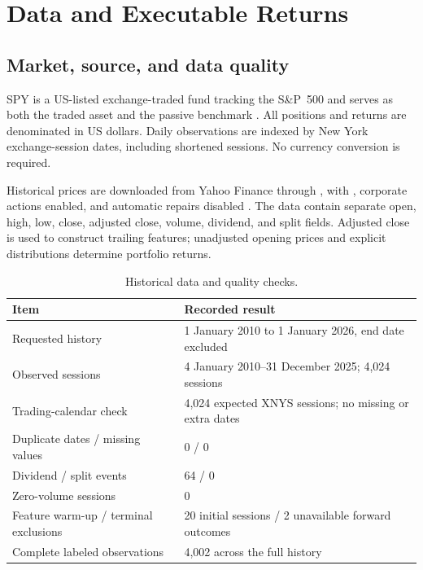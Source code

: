 \section{Data and Executable Returns}
\label{sec:data}
\subsection{Market, source, and data quality}
SPY is a US-listed exchange-traded fund tracking the S\&P~500 and serves as both the traded asset and the passive benchmark \citep{spy}. All positions and returns are denominated in US dollars. Daily observations are indexed by New York exchange-session dates, including shortened sessions. No currency conversion is required.

Historical prices are downloaded from Yahoo Finance through , with , corporate actions enabled, and automatic repairs disabled \citep{yfinance}. The data contain separate open, high, low, close, adjusted close, volume, dividend, and split fields. Adjusted close is used to construct trailing features; unadjusted opening prices and explicit distributions determine portfolio returns.

\begin{table}[!htbp]
\centering\small
\caption{Historical data and quality checks.}
\label{tab:data}
\begin{tabularx}{\textwidth}{@{}p{}X@{}}
\toprule
Item & Recorded result \\
\midrule
Requested history & 1 January 2010 to 1 January 2026, end date excluded \\
Observed sessions & 4 January 2010--31 December 2025; 4,024 sessions \\
Trading-calendar check & 4,024 expected XNYS sessions; no missing or extra dates \\
Duplicate dates / missing values & 0 / 0 \\
Dividend / split events & 64 / 0 \\
Zero-volume sessions & 0 \\
Feature warm-up / terminal exclusions & 20 initial sessions / 2 unavailable forward outcomes \\
Complete labeled observations & 4,002 across the full history \\
\bottomrule
\end{tabularx}
\end{table}

